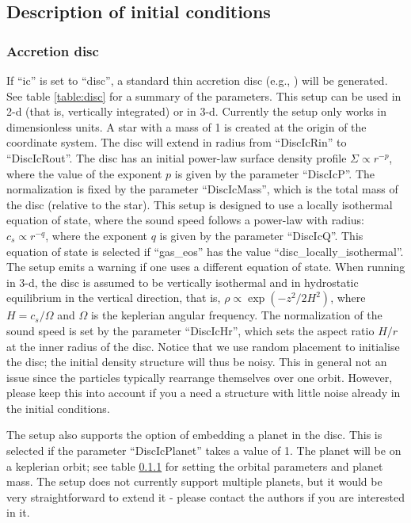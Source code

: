 \documentclass[a4paper]{article}
\begin{document}
\subsection{Description of initial conditions}

\subsubsection{Accretion disc}

\label{sec:disc}

If ``ic'' is set to ``disc'', a standard thin accretion disc (e.g., \citealt{Pringle1981}) will be generated. See table \ref{table:disc} for a summary of the parameters. This setup can be used in 2-d (that is, vertically integrated) or in 3-d. Currently the setup only works in dimensionless units. A star with a mass of 1 is created at the origin of the coordinate system. The disc will extend in radius from ``DiscIcRin'' to ``DiscIcRout''. The disc has an initial power-law surface density profile $\Sigma \propto r^{-p}$, where the value of the exponent $p$ is given by the parameter ``DiscIcP''. The normalization is fixed by the parameter ``DiscIcMass'', which is the total mass of the disc (relative to the star). This setup is designed to use a locally isothermal equation of state, where the sound speed follows a power-law with radius: $c_s \propto r^{-q}$, where the exponent $q$ is given by the parameter ``DiscIcQ''. This equation of state is selected if ``gas\_eos'' has the value ``disc\_locally\_isothermal''. The setup emits a warning if one uses a different equation of state. When running in 3-d, the disc is assumed to be vertically isothermal and in hydrostatic equilibrium in the vertical direction, that is, $\rho \propto \exp (-z^2/2H^2)$, where $H=c_s/\Omega$ and $\Omega$ is the keplerian angular frequency. The normalization of the sound speed is set by the parameter ``DiscIcHr'', which sets the aspect ratio $H/r$ at the inner radius of the disc. Notice that we use random placement to initialise the disc; the initial density structure will thus be noisy. This in general not an issue since the particles typically rearrange themselves over one orbit. However, please keep this into account if you a need a structure with little noise already in the initial conditions.

The setup also supports the option of embedding a planet in the disc. This is selected if the parameter ``DiscIcPlanet'' takes a value of 1. The planet will be on a keplerian orbit; see table \ref{sec:disc} for setting the orbital parameters and planet mass. The setup does not currently support multiple planets, but it would be very straightforward to extend it - please contact the authors if you are interested in it.
\end{document}
